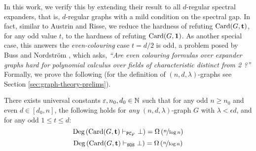 \documentclass[11pt]{article}
\begin{document}
In this work, we verify this by extending their result to all $d$-regular spectral expanders, that is, $d$-regular graphs with a mild condition on the spectral gap.
In fact, similar to Austrin and Risse, we reduce the hardness of refuting $\text{Card}(G, \mathbf{t})$, for any odd value $t$, to the hardness of refuting $\text{Card}(G, \mathbf{1})$.
As another special case, this answers the \emph{even-colouring} case $t = d/2$ is odd, a problem posed by Buss and Nordstr\"{o}m \citep[Open Problem 7.7]{buss2021proof}, which asks, \textit{``Are even colouring formulas over expander graphs hard for polynomial calculus over fields of characteristic distinct from 2 ?''}
Formally, we prove the following (for the definition of $(n, d, \lambda)$-graphs see Section \ref{sec:graph-theory-prelims}).


\begin{theorem}\label{thm:general-hardness-result}

  There exists universal constants $\varepsilon, n_0, d_0 \in \mathbb{N}$ such that for any odd $n \ge n_0$ and even $d \in [d_0, n]$, the following holds for \emph{any} $(n, d, \lambda)$-graph $G$ with $\lambda < \epsilon d$, and for any odd $1 \leq t \leq d$:  
  \[ \text{Deg}\left(\text{Card}(G, \mathbf{t}) \vdash_{\texttt{PC}_F} \bot\right) = \Omega\left(\nicefrac{n}{\log n}\right)\]
  \[ \text{Deg}\left(\text{Card}(G, \mathbf{t}) \vdash_{\texttt{SOS}} \bot\right) = \Omega\left(\nicefrac{n}{\log n}\right)\]  
\end{theorem}
\end{document}
